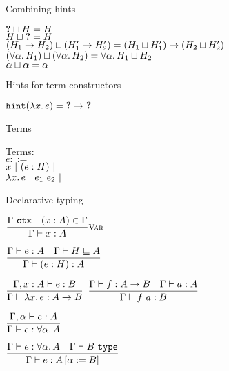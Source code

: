 \documentclass{beamer}
\begin{document}
\begin{frame}{Combining hints}

\begin{center}
  $\hintlub{\Hole}{H} = H$ \\
  $\hintlub{H}{\Hole} = H$ \\
  $\hintlub{(\Fun{H_1}{H_2})}{(\Fun{H'_1}{H'_2})} = \Fun{(\hintlub{H_1}{H'_1})}{(\hintlub{H_2}{H'_2})}$ \\
  $\hintlub{(\ForallT{\alpha}{H_1})}{(\ForallT{\alpha}{H_2})} = \ForallT{\alpha}{\hintlub{H_1}{H_2}}$ \\
  $\hintlub{\alpha}{\alpha} = \alpha$
\end{center}

\end{frame}

\begin{frame}{Hints for term constructors}

\begin{center}
  $\hintfor{\fun{x}{e}} = \Fun{\Hole}{\Hole}$ \\
\end{center}

\end{frame}

\begin{frame}{Terms}

Terms: \\
$e ::=$ \\
\qquad $x \pipe \annot{e}{H} \pipe $ \\
\qquad $\fun{x}{e} \pipe \app{e_1}{e_2} \pipe$

\end{frame}

\begin{frame}{Declarative typing}

\begin{center}
  $\infrule[Var]{\tyctx{\Gamma} \quad \sidecond{(x : A) \in \Gamma}}{\typing{x}{A}}$

  \vspace{2em}

  $\infrule{\typing{e}{A} \quad \sidecond{\hintorderinctx{H}{A}}}{\typing{\annot{e}{H}}{A}}$

  \vspace{2em}

  $\infrule{\fulltyping{\extend{\Gamma}{x}{A}}{e}{B}}{\typing{\fun{x}{e}}{\Fun{A}{B}}}$ \quad
  $\infrule{\typing{f}{\Fun{A}{B}} \quad \typing{a}{A}}{\typing{\app{f}{a}}{B}}$

  \vspace{2em}

  $\infrule{\fulltyping{\extendtype{\Gamma}{\alpha}}{e}{A}}{\typing{e}{\ForallT{\alpha}{A}}}$

  \vspace{2em}

  $\infrule{\typing{e}{\ForallT{\alpha}{A}} \quad \type{B}}{\typing{e}{\subst{A}{\alpha}{B}}}$
\end{center}

\end{frame}
\end{document}
